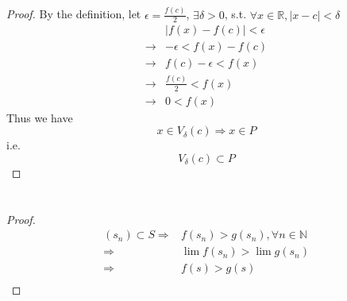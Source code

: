 \documentclass{article}
\begin{document}
    \section{}
        \begin{proof}
            By the definition, let $\epsilon=\frac{f(c)}{2}$, $\exists \delta>0$, s.t. $\forall x\in\mathbb{R}, |x-c|<\delta$
            \begin{equation*}
                \begin{split}
                    &|f(x)-f(c)|<\epsilon\\
                    \rightarrow&-\epsilon<f(x)-f(c)\\
                    \rightarrow&f(c)-\epsilon<f(x)\\
                    \rightarrow&\frac{f(c)}{2}<f(x)\\
                    \rightarrow&0<f(x)
                \end{split}
            \end{equation*}
            Thus we have $$x\in V_\delta(c)\Rightarrow x\in P$$
            i.e.
            $$V_\delta(c)\subset P$$
        \end{proof}
    \section{}
        \begin{proof}
            \begin{equation*}
                \begin{split}
                    (s_n)\subset S \Rightarrow &f(s_n)>g(s_n),\forall n\in \mathbb{N}\\
                    \Rightarrow&\lim f(s_n)>\lim g(s_n)\\
                    \Rightarrow&f(s)>g(s)\\
                \end{split}
            \end{equation*}
        \end{proof}
\end{document}
